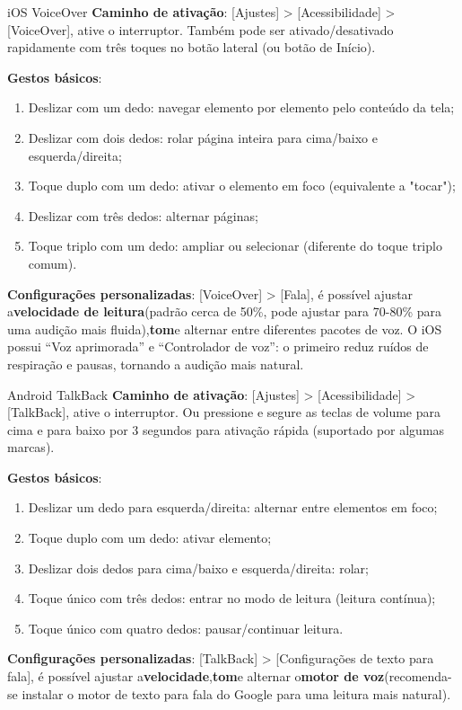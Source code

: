 \begin{tcbinfo}{iOS VoiceOver}
\textbf{Caminho de ativação}: [Ajustes] > [Acessibilidade] > [VoiceOver], ative o interruptor. Também pode ser ativado/desativado rapidamente com três toques no botão lateral (ou botão de Início).

\textbf{Gestos básicos}:

\begin{enumerate}
  \item Deslizar com um dedo: navegar elemento por elemento pelo conteúdo da tela;
  \item Deslizar com dois dedos: rolar página inteira para cima/baixo e esquerda/direita;
  \item Toque duplo com um dedo: ativar o elemento em foco (equivalente a "tocar");
  \item Deslizar com três dedos: alternar páginas;
  \item Toque triplo com um dedo: ampliar ou selecionar (diferente do toque triplo comum).
\end{enumerate}

\textbf{Configurações personalizadas}: [VoiceOver] > [Fala], é possível ajustar a\textbf{velocidade de leitura}(padrão cerca de 50\%, pode ajustar para 70-80\% para uma audição mais fluida),\textbf{tom}e alternar entre diferentes pacotes de voz. O iOS possui “Voz aprimorada” e “Controlador de voz”: o primeiro reduz ruídos de respiração e pausas, tornando a audição mais natural.

\end{tcbinfo}

\begin{tcbinfo}{Android TalkBack}
\textbf{Caminho de ativação}: [Ajustes] > [Acessibilidade] > [TalkBack], ative o interruptor. Ou pressione e segure as teclas de volume para cima e para baixo por 3 segundos para ativação rápida (suportado por algumas marcas).

\textbf{Gestos básicos}:

\begin{enumerate}
  \item Deslizar um dedo para esquerda/direita: alternar entre elementos em foco;
  \item Toque duplo com um dedo: ativar elemento;
  \item Deslizar dois dedos para cima/baixo e esquerda/direita: rolar;
  \item Toque único com três dedos: entrar no modo de leitura (leitura contínua);
  \item Toque único com quatro dedos: pausar/continuar leitura.
\end{enumerate}

\textbf{Configurações personalizadas}: [TalkBack] > [Configurações de texto para fala], é possível ajustar a\textbf{velocidade},\textbf{tom}e alternar o\textbf{motor de voz}(recomenda-se instalar o motor de texto para fala do Google para uma leitura mais natural).

\end{tcbinfo}

